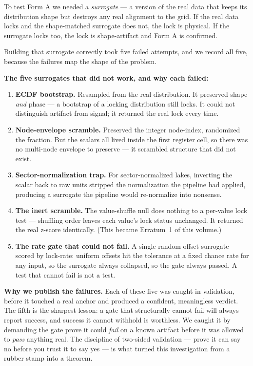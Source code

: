 \documentclass[11pt, letterpaper, openany]{book}
\begin{document}
To test Form A we needed a \emph{surrogate} --- a version of the real data that keeps
its distribution shape but destroys any real alignment to the grid. If the real data
locks and the shape-matched surrogate does not, the lock is physical. If the surrogate
locks too, the lock is shape-artifact and Form A is confirmed.

Building that surrogate correctly took five failed attempts, and we record all five,
because the failures map the shape of the problem.

\begin{empiricalbox}
\textbf{The five surrogates that did not work, and why each failed:}
\begin{enumerate}
\item \textbf{ECDF bootstrap.} Resampled from the real distribution. It preserved
shape \emph{and} phase --- a bootstrap of a locking distribution still locks. It
could not distinguish artifact from signal; it returned the real lock every time.
\item \textbf{Node-envelope scramble.} Preserved the integer node-index, randomized
the fraction. But the scalars all lived inside the first register cell, so there was
no multi-node envelope to preserve --- it scrambled structure that did not exist.
\item \textbf{Sector-normalization trap.} For sector-normalized lakes, inverting the
scalar back to raw units stripped the normalization the pipeline had applied,
producing a surrogate the pipeline would re-normalize into nonsense.
\item \textbf{The inert scramble.} The value-shuffle null does nothing to a per-value
lock test --- shuffling order leaves each value's lock status unchanged. It returned
the real z-score identically. (This became Erratum~1 of this volume.)
\item \textbf{The rate gate that could not fail.} A single-random-offset surrogate
scored by lock-rate: uniform offsets hit the tolerance at a fixed chance rate for any
input, so the surrogate always collapsed, so the gate always passed. A test that
cannot fail is not a test.
\end{enumerate}
\end{empiricalbox}

\begin{warningbox}
\textbf{Why we publish the failures.} Each of these five was caught in validation,
before it touched a real anchor and produced a confident, meaningless verdict. The
fifth is the sharpest lesson: a gate that structurally cannot fail will always
report success, and success it cannot withhold is worthless. We caught it by
demanding the gate prove it could \emph{fail} on a known artifact before it was
allowed to \emph{pass} anything real. The discipline of two-sided validation ---
prove it can say no before you trust it to say yes --- is what turned this
investigation from a rubber stamp into a theorem.
\end{warningbox}
\end{document}
